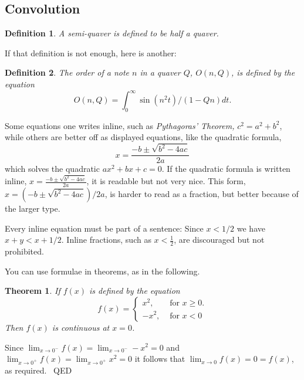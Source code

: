 \documentclass{article}
\newtheorem{theorem}{Theorem}
\newtheorem{definition}{Definition}
\newenvironment{proof}{{\sc Proof:}}{~\hfill QED}
\begin{document}
\subsection{Convolution}

\begin{definition}
     A {\em semi-quaver} is defined to be half a quaver.
\end{definition}

If that definition is not enough, here is another:

\begin{definition}
    The {\em order} of a note $n$ in a quaver $Q$,
    $O(n,Q)$, is defined by the equation
         $$ O(n,Q) = \int_{0}^{\infty} \sin(n^{2} t)/(1-Qn) dt. $$
\end{definition}

Some equations one writes inline, such as
{\em Pythagoras' Theorem,}
$c^{2} = a^{2} + b^{2}$,
while others are better off as displayed
equations, like the quadratic formula,
  $$x = \frac{-b \pm \sqrt{b^{2} - 4ac}}{2a}$$
which solves the quadratic $ax^{2} + bx + c = 0$. If the quadratic
formula is written inline,
  $x = \frac{-b \pm \sqrt{b^{2} - 4ac}}{2a}$,
it is readable but not very nice.
This form,
  $x = (-b \pm \sqrt{b^{2} - 4ac})/2a$,
is harder to read as a fraction, but better because of the larger type.

Every inline equation must be part of a sentence:  Since $x < 1/2$ we have
$x + y < x + 1/2$.  Inline fractions, such as $x < \frac{1}{2}$, are discouraged but
not prohibited.


You can use formulae in theorems, as in the following.

\begin{theorem}\label{ContThrm}
    If $f(x)$ is defined by the equation
    \begin{equation}\label{SplitFunc}
         f(x) = \left\{ \begin{array}{rl}
                          x^{2}, & \mbox{~for $x \geq 0$.} \\
                         -x^{2}, & \mbox{~for $x < 0$}
                         \end{array} \right.
   \end{equation}
   Then $f(x)$ is continuous at $x=0$.
\end{theorem}


\begin{proof}
    Since
          $\lim_{x \rightarrow 0^{-}} f(x) =
           \lim_{x \rightarrow 0^{-}} -x^{2} = 0$
    and
          $\lim_{x \rightarrow 0^{+}} f(x) =
           \lim_{x \rightarrow 0^{+}} x^{2} = 0$
    it follows that
         $\lim_{x \rightarrow 0} f(x) = 0 = f(x)$,
         as required.
\end{proof}
\end{document}

